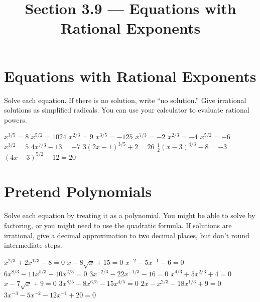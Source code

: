

\title{Section 3.9 --- Equations with Rational Exponents}


\maketitle

\section*{Equations with Rational Exponents}
Solve each equation. If there is no solution, write ``no solution.'' Give irrational solutions as simplified radicals. You can use your calculator to evaluate rational powers.
\begin{smenum}
\mitemxxx
{$x^{3/5}=8$}
{$x^{5/2}=1024$}
{$x^{2/3}=9$}
\mitemxxx
{$x^{3/5}=-125$}
{$x^{7/3}=-2$}
{$x^{2/3}=-4$}
\mitemxxx
{$x^{5/2}=-6$}
{$x^{3/2}=5$}
{$4x^{7/3}-13=-7$}
\mitemxxx
{$3(2x-1)^{3/5}+2=26$}
{$\frac{1}{2}(x-3)^{4/3}-8=-3$}
{$(4x-3)^{5/2}-12=20$}
\end{smenum}

\section*{Pretend Polynomials}
Solve each equation by treating it as a polynomial. You might be able to solve by factoring, or you might need to use the quadratic formula. If solutions are irrational, give a decimal approximation to two decimal places, but don't round intermediate steps.
\begin{smenum}
\mitemxx
{$x^{2/3}+2x^{1/3}-8=0$}
{$x-8\sqrt{x}+15=0$}
\mitemxx
{$x^{-2}-5x^{-1}-6=0$}
{$6x^{8/3}-11x^{5/3}-10x^{2/3}=0$}
\mitemxx
{$3x^{-2/3}-22x^{-1/3}-16=0$}
{$x^{4/3}+5x^{2/3}+4=0$}
\mitemxx
{$x-7\sqrt{x}+9=0$}
{$3x^{8/5}-8x^{6/5}-15x^{4/5}=0$}
\mitemxx
{$2x-x^{2/3}-18x^{1/3}+9=0$}
{$3x^{-3}-5x^{-2}-12x^{-1}+20=0$}
\end{smenum}



